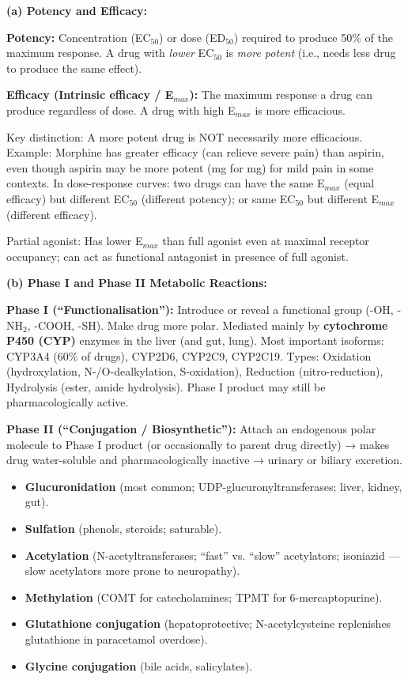 \documentclass[11pt,a4paper]{article}
\begin{document}
\begin{ansbox}
\textbf{(a) Potency and Efficacy:}

\textbf{Potency:} Concentration (EC$_{50}$) or dose (ED$_{50}$) required to produce 50\% of the maximum response. A drug with \textit{lower} EC$_{50}$ is \textit{more potent} (i.e., needs less drug to produce the same effect).

\textbf{Efficacy (Intrinsic efficacy / E$_{max}$):} The maximum response a drug can produce regardless of dose. A drug with high E$_{max}$ is more efficacious.

Key distinction: A more potent drug is NOT necessarily more efficacious. Example: Morphine has greater efficacy (can relieve severe pain) than aspirin, even though aspirin may be more potent (mg for mg) for mild pain in some contexts. In dose-response curves: two drugs can have the same E$_{max}$ (equal efficacy) but different EC$_{50}$ (different potency); or same EC$_{50}$ but different E$_{max}$ (different efficacy).

Partial agonist: Has lower E$_{max}$ than full agonist even at maximal receptor occupancy; can act as functional antagonist in presence of full agonist.

\textbf{(b) Phase I and Phase II Metabolic Reactions:}

\textbf{Phase I (``Functionalisation''):}
Introduce or reveal a functional group (-OH, -NH$_2$, -COOH, -SH). Make drug more polar. Mediated mainly by \textbf{cytochrome P450 (CYP)} enzymes in the liver (and gut, lung). Most important isoforms: CYP3A4 (60\% of drugs), CYP2D6, CYP2C9, CYP2C19. Types: Oxidation (hydroxylation, N-/O-dealkylation, S-oxidation), Reduction (nitro-reduction), Hydrolysis (ester, amide hydrolysis). Phase I product may still be pharmacologically active.

\textbf{Phase II (``Conjugation / Biosynthetic''):}
Attach an endogenous polar molecule to Phase I product (or occasionally to parent drug directly) → makes drug water-soluble and pharmacologically inactive → urinary or biliary excretion.
\begin{itemize}[leftmargin=*]
    \item \textbf{Glucuronidation} (most common; UDP-glucuronyltransferases; liver, kidney, gut).
    \item \textbf{Sulfation} (phenols, steroids; saturable).
    \item \textbf{Acetylation} (N-acetyltransferases; ``fast'' vs. ``slow'' acetylators; isoniazid — slow acetylators more prone to neuropathy).
    \item \textbf{Methylation} (COMT for catecholamines; TPMT for 6-mercaptopurine).
    \item \textbf{Glutathione conjugation} (hepatoprotective; N-acetylcysteine replenishes glutathione in paracetamol overdose).
    \item \textbf{Glycine conjugation} (bile acids, salicylates).
\end{itemize}


\end{ansbox}
\end{document}
